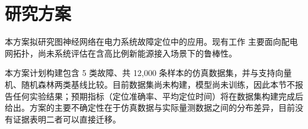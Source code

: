 \section{研究方案}

本方案拟研究图神经网络在电力系统故障定位中的应用。现有工作 \cite{wu2021gnn} 主要面向配电网拓扑，尚未系统评估在含高比例新能源接入场景下的鲁棒性。

本方案计划构建包含 5 类故障、共 12{,}000 条样本的仿真数据集，并与支持向量机、随机森林两类基线比较。目前数据集尚未构建，模型尚未训练，因此本节不报告任何实验结果；预期指标（定位准确率、平均定位时间）将在数据集构建完成后给出。方案的主要不确定性在于仿真数据与实际量测数据之间的分布差异，目前没有证据表明二者可以直接迁移。
